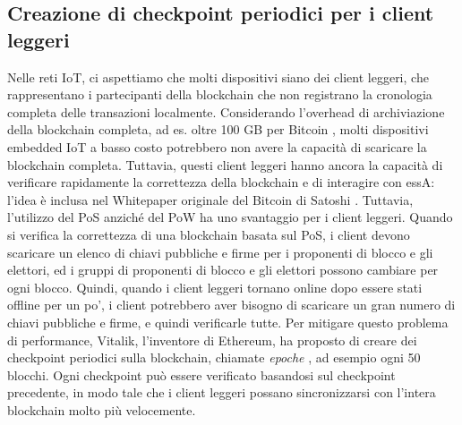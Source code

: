 \subsection{Creazione di checkpoint periodici per i client leggeri}
Nelle reti IoT, ci aspettiamo che molti dispositivi siano dei client leggeri, che rappresentano i partecipanti della blockchain che non registrano la cronologia completa delle transazioni localmente. Considerando l'overhead di archiviazione della blockchain completa, ad es. oltre 100 GB per Bitcoin \cite{c4}, molti dispositivi embedded IoT a basso costo potrebbero non avere la capacità di scaricare la blockchain completa. Tuttavia, questi client leggeri hanno ancora la capacità di verificare rapidamente la correttezza della blockchain e di interagire con essA: l'idea è inclusa nel Whitepaper originale del Bitcoin di Satoshi \cite{c21}.
Tuttavia, l'utilizzo del PoS anziché del PoW ha uno svantaggio per i client leggeri. Quando si verifica la correttezza di una blockchain basata sul PoS, i client devono scaricare un elenco di chiavi pubbliche e firme per i proponenti di blocco e gli elettori, ed i gruppi di proponenti di blocco
e gli elettori possono cambiare per ogni blocco. Quindi, quando i client leggeri tornano online dopo essere stati offline per un po', i client potrebbero aver bisogno di scaricare un gran numero di chiavi pubbliche e firme, e quindi verificarle tutte. Per mitigare questo problema di performance, Vitalik, l'inventore di Ethereum, ha proposto di creare dei checkpoint periodici sulla blockchain, chiamate \emph{epoche} \cite{c6}, ad esempio ogni 50 blocchi. Ogni checkpoint
può essere verificato basandosi sul checkpoint precedente, in modo tale che i client leggeri possano sincronizzarsi con l'intera blockchain molto più velocemente.

